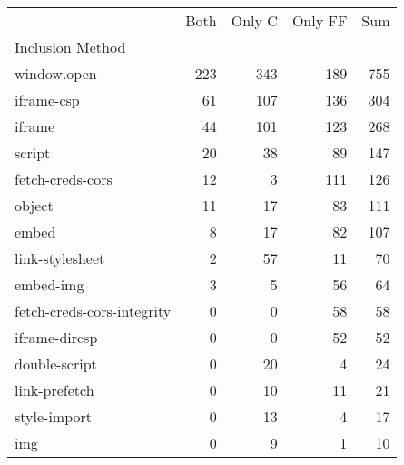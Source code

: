 \begin{tabular}{lrrrr}
\toprule
 & Both & Only C & Only FF & Sum \\
Inclusion Method &  &  &  &  \\
\midrule
window.open & 223 & 343 & 189 & 755 \\
iframe-csp & 61 & 107 & 136 & 304 \\
iframe & 44 & 101 & 123 & 268 \\
script & 20 & 38 & 89 & 147 \\
fetch-creds-cors & 12 & 3 & 111 & 126 \\
object & 11 & 17 & 83 & 111 \\
embed & 8 & 17 & 82 & 107 \\
link-stylesheet & 2 & 57 & 11 & 70 \\
embed-img & 3 & 5 & 56 & 64 \\
fetch-creds-cors-integrity & 0 & 0 & 58 & 58 \\
iframe-dircsp & 0 & 0 & 52 & 52 \\
double-script & 0 & 20 & 4 & 24 \\
link-prefetch & 0 & 10 & 11 & 21 \\
style-import & 0 & 13 & 4 & 17 \\
img & 0 & 9 & 1 & 10 \\
\bottomrule
\end{tabular}
